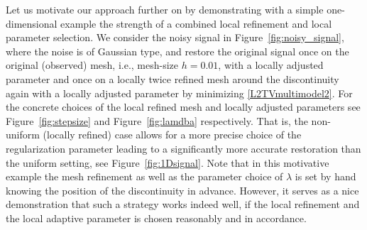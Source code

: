 \documentclass[enabledeprecatedfontcommands,cleardoublepage=empty,headsepline,twoside,11pt,DIV=15,BCOR=12mm,final]{scrartcl}
\begin{document}
Let us motivate our approach further on by demonstrating with a simple one-dimensional example the strength of a combined local refinement and local parameter selection. We consider the noisy signal in Figure~\ref{fig:noisy_signal}, where the noise is of Gaussian type, and restore the original signal once on the original (observed) mesh, i.e., mesh-size $h=0.01$, with a locally adjusted parameter and once on a locally twice refined mesh around the discontinuity again with a locally adjusted parameter by minimizing \eqref{L2TVmultimodel2}. For the concrete choices of the local refined mesh and locally adjusted parameters see Figure~\ref{fig:stepsize} and Figure~\ref{fig:lamdba} respectively. That is, the non-uniform (locally refined) case allows for a more precise choice of the regularization parameter leading to a significantly more accurate restoration than the uniform setting, see Figure~\ref{fig:1Dsignal}.
 Note that in this motivative example the mesh refinement as well as the parameter choice of $\lambda$ is set by hand knowing the position of the discontinuity in advance. However, it serves as a nice demonstration that such a strategy works indeed well, if the local refinement and the local adaptive parameter is chosen reasonably and in accordance. 
 
\end{document}
